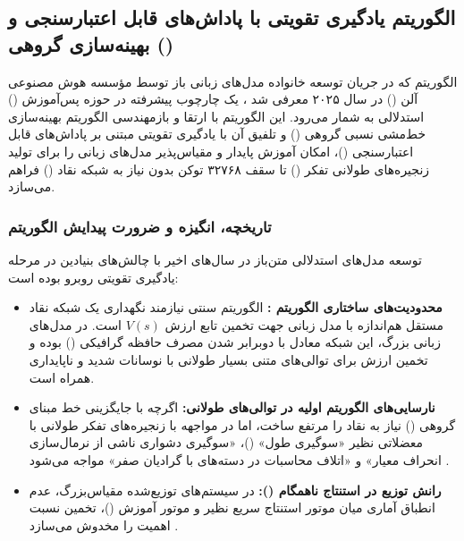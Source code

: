 \subsection{الگوریتم یادگیری تقویتی با پاداش‌های قابل اعتبارسنجی و بهینه‌سازی گروهی ()}

الگوریتم  که در جریان توسعه خانواده مدل‌های زبانی باز  توسط مؤسسه هوش مصنوعی آلن () در سال ۲۰۲۵ معرفی شد \cite{olmo32025}، یک چارچوب پیشرفته در حوزه پس‌آموزش () استدلالی به شمار می‌رود. این الگوریتم با ارتقا و بازمهندسی الگوریتم بهینه‌سازی خط‌مشی نسبی گروهی () \cite{shao2024deepseekmath} و تلفیق آن با یادگیری تقویتی مبتنی بر پاداش‌های قابل اعتبارسنجی ()، امکان آموزش پایدار و مقیاس‌پذیر مدل‌های زبانی را برای تولید زنجیره‌های طولانی تفکر () تا سقف ۳۲۷۶۸ توکن بدون نیاز به شبکه نقاد () فراهم می‌سازد.

\subsubsection*{تاریخچه، انگیزه و ضرورت پیدایش الگوریتم}

توسعه مدل‌های استدلالی متن‌باز در سال‌های اخیر با چالش‌های بنیادین در مرحله یادگیری تقویتی روبرو بوده است:
\begin{itemize}
    \item \textbf{محدودیت‌های ساختاری الگوریتم :} الگوریتم سنتی  \cite{schulman2017proximal} نیازمند نگهداری یک شبکه نقاد مستقل هم‌اندازه با مدل زبانی جهت تخمین تابع ارزش $V(s)$ است. در مدل‌های زبانی بزرگ، این شبکه معادل با دوبرابر شدن مصرف حافظه گرافیکی () بوده و تخمین ارزش برای توالی‌های متنی بسیار طولانی با نوسانات شدید و ناپایداری همراه است.
    \item \textbf{نارسایی‌های الگوریتم  اولیه در توالی‌های طولانی:} اگرچه  \cite{shao2024deepseekmath} با جایگزینی خط مبنای گروهی () نیاز به نقاد را مرتفع ساخت، اما در مواجهه با زنجیره‌های تفکر طولانی با معضلاتی نظیر «سوگیری طول» ()، «سوگیری دشواری ناشی از نرمال‌سازی انحراف معیار» \cite{liu2025drgrpo} و «اتلاف محاسبات در دسته‌های با گرادیان صفر» مواجه می‌شود \cite{yu2025dapo}.
    \item \textbf{رانش توزیع در استنتاج ناهمگام ():} در سیستم‌های توزیع‌شده مقیاس‌بزرگ، عدم انطباق آماری میان موتور استنتاج سریع نظیر  و موتور آموزش ()، تخمین نسبت اهمیت را مخدوش می‌سازد \cite{yao2025offpolicy}.
\end{itemize}

